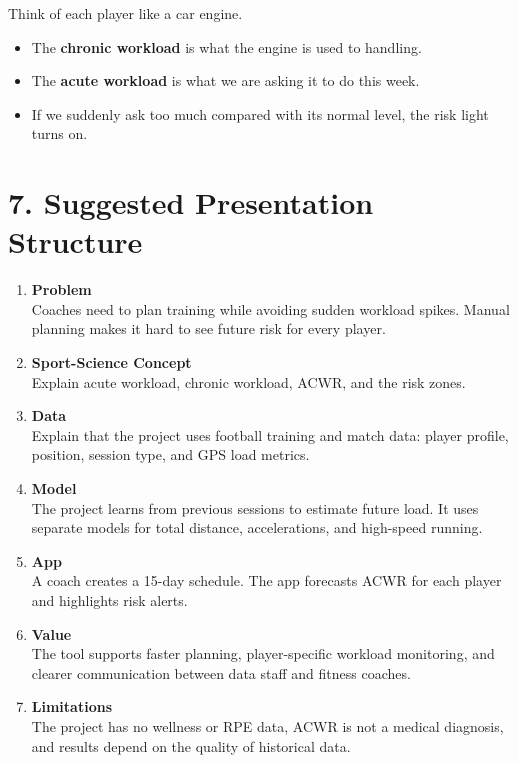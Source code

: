 \documentclass[11pt,a4paper]{article}
\begin{document}
Think of each player like a car engine.

\begin{itemize}
  \item The \textbf{chronic workload} is what the engine is used to handling.
  \item The \textbf{acute workload} is what we are asking it to do this week.
  \item If we suddenly ask too much compared with its normal level, the risk light turns on.
\end{itemize}

\section*{7. Suggested Presentation Structure}

\begin{enumerate}
  \item \textbf{Problem}\\
  Coaches need to plan training while avoiding sudden workload spikes. Manual planning makes it hard to see future risk for every player.

  \item \textbf{Sport-Science Concept}\\
  Explain acute workload, chronic workload, ACWR, and the risk zones.

  \item \textbf{Data}\\
  Explain that the project uses football training and match data: player profile, position, session type, and GPS load metrics.

  \item \textbf{Model}\\
  The project learns from previous sessions to estimate future load. It uses separate models for total distance, accelerations, and high-speed running.

  \item \textbf{App}\\
  A coach creates a 15-day schedule. The app forecasts ACWR for each player and highlights risk alerts.

  \item \textbf{Value}\\
  The tool supports faster planning, player-specific workload monitoring, and clearer communication between data staff and fitness coaches.

  \item \textbf{Limitations}\\
  The project has no wellness or RPE data, ACWR is not a medical diagnosis, and results depend on the quality of historical data.
\end{enumerate}
\end{document}
